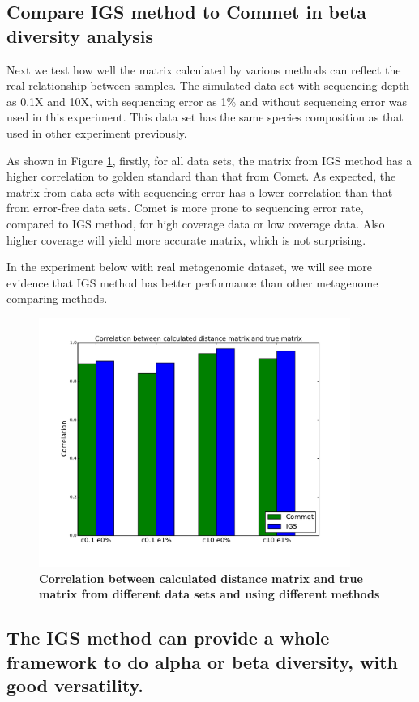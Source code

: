 \subsection{Compare IGS method to Commet in beta diversity analysis}


Next we test how well the matrix calculated by various methods can reflect the
real relationship between samples. 
The simulated data set with sequencing depth as 0.1X and 10X, with 
sequencing error as 1\% and without sequencing error was used in this experiment.
This data set has the same species composition as that used in other experiment previously.

As shown in Figure \ref{fig:compare_commet}, firstly, for 
all data sets, the matrix from IGS method has a higher 
correlation to golden standard than that from Comet.  As expected, 
the matrix from data sets with sequencing error has a lower correlation 
than that from error-free
data sets. Comet is more prone to sequencing error rate, compared to 
IGS method, for high coverage data or low coverage data.
Also higher coverage will yield more accurate matrix, which is not surprising.

In the experiment below with real metagenomic dataset, we will see more evidence
that IGS method has better performance than other metagenome comparing methods.

\begin{figure}[!ht]
 \centerline{\includegraphics[width=4in]{./figures/compare_commet.pdf}}
\caption{\bf Correlation between calculated distance matrix and true matrix from different data sets and using different methods}
\label{fig:compare_commet}
\end{figure}

\subsection{The IGS method can provide a whole framework to do alpha or 
beta diversity, with good versatility.}

